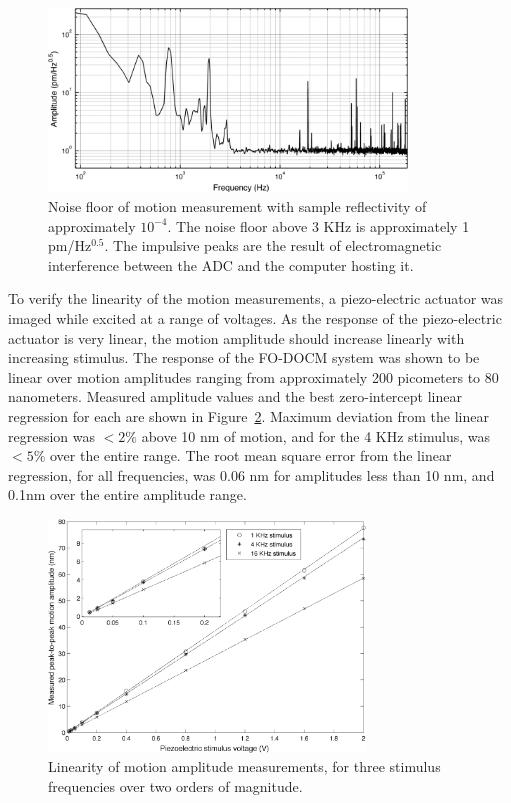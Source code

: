 \begin{figure}[h!]
\centering
\includegraphics[width=0.85\textwidth]{Images/Results/noise_floor_2_big.png}
\caption[Noise floor of motion measurement with sample reflectivity of approximately $10^{-4}$.]{Noise floor of motion measurement with sample reflectivity of approximately $10^{-4}$. The noise floor above 3 KHz is approximately 1 pm/Hz$^{0.5}$. The impulsive peaks are the result of electromagnetic interference between the ADC and the computer hosting it. \label{fig:noise_floor2}}
\end{figure}

To verify the linearity of the motion measurements, a piezo-electric actuator was imaged while excited at a range of voltages. As the response of the piezo-electric actuator is very linear, the motion amplitude should increase linearly with increasing stimulus. \cite{klaassen} The response of the FO-DOCM system was shown to be linear over motion amplitudes ranging from approximately 200 picometers to 80 nanometers. Measured amplitude values and the best zero-intercept linear regression for each are shown in Figure~\ref{fig:motion_linearity}. Maximum deviation from the linear regression was $<2\%$ above 10 nm of motion, and for the 4 KHz stimulus, was $<5\%$ over the entire range. The root mean square error from the linear regression, for all frequencies, was 0.06 nm for amplitudes less than 10 nm, and 0.1nm over the entire amplitude range.

\begin{figure}[h!]
\centering
\includegraphics[width=0.75\textwidth]{Images/Results/motion_linearity.png}
\caption[Linearity of motion amplitude measurements]{Linearity of motion amplitude measurements, for three stimulus frequencies over two orders of magnitude.\label{fig:motion_linearity}}
\end{figure}

